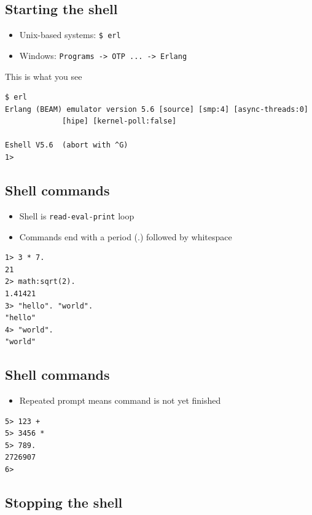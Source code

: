 \documentclass[12pt]{article}
\begin{document}
\subsection{Starting the shell}

\begin{itemize}
\item Unix-based systems:  \verb+$ erl+ 
\item Windows:             \verb+Programs -> OTP ... -> Erlang+ 
\end{itemize}

This is what you see

\begin{verbatim}
$ erl
Erlang (BEAM) emulator version 5.6 [source] [smp:4] [async-threads:0] 
             [hipe] [kernel-poll:false]

Eshell V5.6  (abort with ^G)
1> 
\end{verbatim}

\subsection{Shell commands}

\begin{itemize}
\item Shell is \verb+read-eval-print+ loop
\item Commands end with a period (.) followed by whitespace
\end{itemize}

\begin{verbatim}
1> 3 * 7.
21
2> math:sqrt(2).
1.41421
3> "hello". "world".
"hello"
4> "world".
"world"
\end{verbatim}

\subsection{Shell commands}

\begin{itemize}
\item Repeated prompt means command is not yet finished
\end{itemize}

\begin{verbatim}
5> 123 +
5> 3456 *
5> 789.
2726907
6>
\end{verbatim}

\subsection{Stopping the shell}
\end{document}
